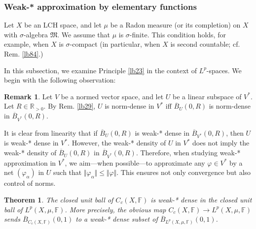 \documentclass[12pt,b5paper,notitlepage]{article}
\theoremstyle{definition}
\newtheorem{rem}[df]{Remark}
\theoremstyle{plain}
\newtheorem{thm}[df]{Theorem}
\newcommand{\fk}{\mathfrak}
\newcommand{\ovl}{\overline}
\newcommand{\Rbb}{\mathbb R}
\newcommand{\Fbb}{\mathbb F}
\newcommand{\hqed}{\hfill\qedsymbol}
\numberwithin{equation}{section}
\begin{document}
\subsubsection{Weak-* approximation by elementary functions}

Let $X$ be an LCH space, and let $\mu$ be a Radon measure (or its completion) on $X$ with $\sigma$-algebra $\fk M$. We assume that $\mu$ is $\sigma$-finite. This condition holds, for example, when $X$ is $\sigma$-compact (in particular, when $X$ is second countable; cf. Rem. \ref{lb84}.)


In this subsection, we examine Principle \ref{lb23} in the context of $L^p$-spaces. We begin with the following observation:

\begin{rem}
Let $V$ be a normed vector space, and let $U$ be a linear subspace of $V^*$. Let $R\in\Rbb_{>0}$. By Rem. \ref{lb29}, $U$ is norm-dense in $V^*$ iff $\ovl B_U(0,R)$ is norm-dense in $\ovl B_{V^*}(0,R)$. 

It is clear from linearity that if $\ovl B_U(0,R)$ is weak-* dense in $\ovl B_{V^*}(0,R)$, then $U$ is weak-* dense in $V^*$. However, the weak-* density of $U$ in $V^*$ does not imply the weak-* density of $\ovl B_U(0,R)$ in $\ovl B_{V^*}(0,R)$. Therefore, when studying weak-* approximation in $V^*$, we aim---when possible---to approximate any $\varphi\in V^*$ by a net $(\varphi_\alpha)$ in $U$ such that $\Vert \varphi_\alpha\Vert\leq\Vert\varphi\Vert$. This ensures not only convergence but also control of norms.  \hqed
\end{rem}


\begin{thm}\label{lb86}
The closed unit ball of $C_c(X,\Fbb)$ is weak-* dense in the closed unit ball of $L^p(X,\mu,\Fbb)$. More precisely, the obvious map $C_c(X,\Fbb)\rightarrow L^p(X,\mu,\Fbb)$ sends $\ovl B_{C_c(X,\Fbb)}(0,1)$ to a weak-* dense subset of $\ovl B_{L^p(X,\mu,\Fbb)}(0,1)$.
\end{thm}
\end{document}
